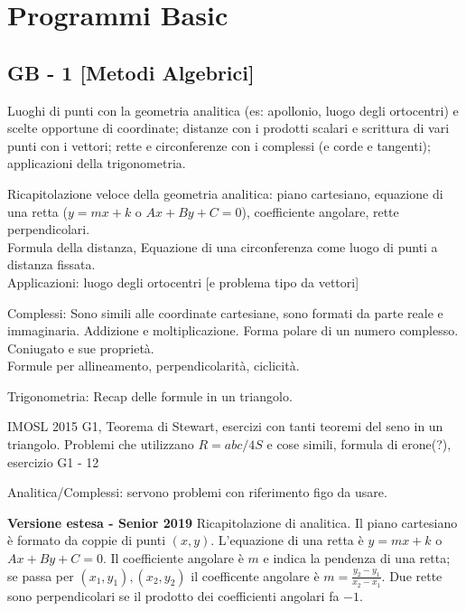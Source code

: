 \section{Programmi Basic}

\subsection{GB - 1 [Metodi Algebrici]}
\begin{short}
 Luoghi di punti con la geometria analitica (es: apollonio, luogo degli ortocentri) e scelte opportune di coordinate; distanze con i prodotti scalari e scrittura di vari punti con i vettori; rette e circonferenze con i complessi (e corde e tangenti); applicazioni della trigonometria.
\end{short}

Ricapitolazione veloce della geometria analitica: piano cartesiano, equazione di una retta ($y=mx+k$ o $Ax+By+C=0$), coefficiente angolare, rette perpendicolari.\\
Formula della distanza, Equazione di una circonferenza come luogo di punti a distanza fissata.\\
Applicazioni: luogo degli ortocentri [e problema tipo da vettori]

Complessi: Sono simili alle coordinate cartesiane, sono formati da parte reale e immaginaria. Addizione e moltiplicazione. Forma polare di un numero complesso. Coniugato e sue proprietà. \\
Formule per allineamento, perpendicolarità, ciclicità.



Trigonometria: Recap delle formule in un triangolo. 

IMOSL 2015 G1, Teorema di Stewart, esercizi con tanti teoremi del seno in un triangolo. 
Problemi che utilizzano $R=abc/4S$ e cose simili, formula di erone(?), esercizio G1 - 12

Analitica/Complessi: servono problemi con riferimento figo da usare.



\vspace{0.3cm}
\large{\textbf{Versione estesa - Senior 2019}}\normalsize
Ricapitolazione di analitica. Il piano cartesiano è formato da coppie di punti $(x,y)$. L'equazione di una retta è $y=mx+k$ o $Ax+By+C=0$. Il coefficiente angolare è $m$ e indica la pendenza di una retta; se passa per $(x_1,y_1),(x_2,y_2)$ il coefficente angolare è $m=\frac{y_2-y_1}{x_2-x_1}$. Due rette sono perpendicolari se il prodotto dei coefficienti angolari fa $-1$.\\

